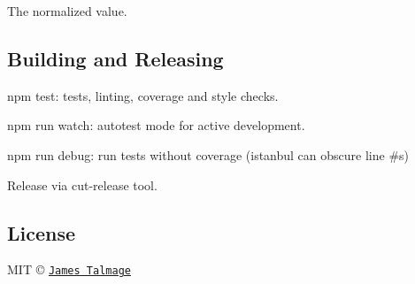 The normalized value.

\subsection*{Building and Releasing}


\begin{DoxyItemize}
\item {\ttfamily npm test}\+: tests, linting, coverage and style checks.
\item {\ttfamily npm run watch}\+: autotest mode for active development.
\item {\ttfamily npm run debug}\+: run tests without coverage (istanbul can obscure line \#\textquotesingle{}s)
\end{DoxyItemize}

Release via {\ttfamily cut-\/release} tool.

\subsection*{License}

M\+IT © \href{http://github.com/jamestalmage}{\tt James Talmage} 